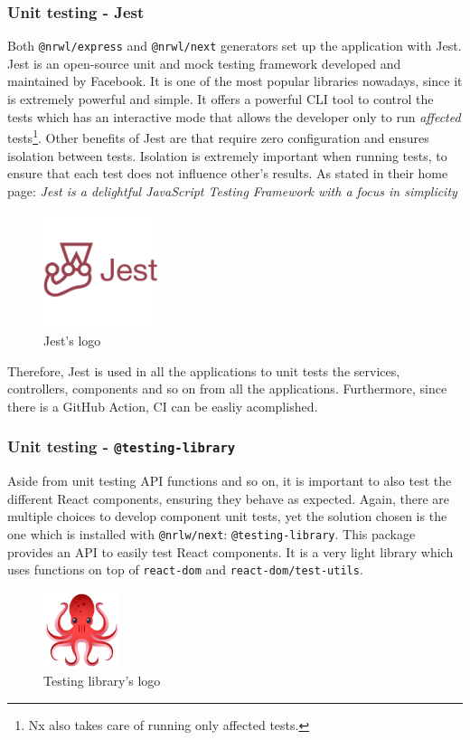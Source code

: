 \documentclass[a4paper, 12pt, oneside]{book}
\begin{document}
\subsubsection{Unit testing - Jest}
Both \texttt{@nrwl/express} and \texttt{@nrwl/next} generators set up the application with Jest. Jest is an open-source unit and mock testing framework developed and maintained by Facebook. It is one of the most popular libraries nowadays, since it is extremely powerful and simple. It offers a powerful CLI tool to control the tests which has an interactive mode that allows the developer only to run \emph{affected} tests\footnote{Nx also takes care of running only affected tests.}. Other benefits of Jest are that require zero configuration and ensures isolation between tests. Isolation is extremely important when running tests, to ensure that each test does not influence other's results. As stated in their home page: \emph{Jest is a delightful JavaScript Testing Framework with a focus in simplicity}
\begin{figure}[H]
	\centering
	\includegraphics[width=0.3\textwidth]{assets/jest-logo.png}
	\caption{Jest's logo}
\end{figure}
Therefore, Jest is used in all the applications to unit tests the services, controllers, components and so on from all the applications. Furthermore, since there is a GitHub Action, CI can be easliy acomplished.
\subsubsection{Unit testing - \texttt{@testing-library}}
Aside from unit testing API functions and so on, it is important to also test the different React components, ensuring they behave as expected. Again, there are multiple choices to develop component unit tests, yet the solution chosen is the one which is installed with \texttt{@nrlw/next}: \texttt{@testing-library}. This package provides an API to easily test React components. It is a very light library which uses functions on top of \texttt{react-dom} and \texttt{react-dom/test-utils}.
\begin{figure}[H]
	\centering
	\includegraphics[width=0.2\textwidth]{assets/testing-library-logo.png}
	\caption{Testing library's logo}
\end{figure}
\end{document}

